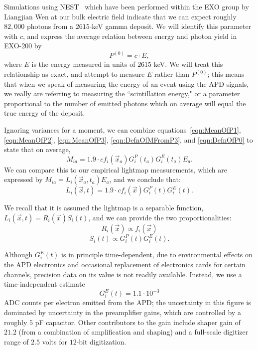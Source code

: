 Simulations using NEST~\cite{NESTpaper} which have been performed within the EXO group by Liangjian Wen at our bulk electric field indicate that we can expect roughly $82,000$ photons from a $2615$-keV gamma deposit.  We will identify this parameter with $c$, and express the average relation between energy and photon yield in EXO-200 by
\begin{equation} \label{eqn:DefnOfP0}
P^{(0)} = c \cdot E,
\end{equation}
where $E$ is the energy measured in units of $2615$ keV.  We will treat this relationship as exact, and attempt to measure $E$ rather than $P^{(0)}$; this means that when we speak of measuring the energy of an event using the APD signals, we really are referring to measuring the ``scintillation energy," or a parameter proportional to the number of emitted photons which on average will equal the true energy of the deposit.

Ignoring variances for a moment, we can combine equations~\ref{eqn:MeanOfP1}, \ref{eqn:MeanOfP2}, \ref{eqn:MeanOfP3}, \ref{eqn:DefnOfMFromP3}, and \ref{eqn:DefnOfP0} to state that on average,
\[M_{ia} = 1.9 \cdot c f_i(\vec{x}_a) G^P_i(t_a) G^E_i(t_a) E_a.\]
We can compare this to our empirical lightmap measurements, which are expressed by $M_{ia} = L_i(\vec{x}_a,t_a) E_a$,
and we conclude that:
\begin{equation}
L_i(\vec{x},t) = 1.9 \cdot c f_i(\vec{x}) G^P_i(t) G^E_i(t).
\end{equation}

We recall that it is assumed the lightmap is a separable function, $L_i(\vec{x},t) = R_i(\vec{x})S_i(t)$, and we can provide the two proportionalities:
\[ R_i(\vec{x}) \propto f_i(\vec{x}) \]
\[ S_i(t) \propto G^P_i(t) G^E_i(t).\]

Although $G^E_i(t)$ is in principle time-dependent, due to environmental effects on the APD electronics and occasional replacement of electronics cards for certain channels, precision data on its value is not readily available.  Instead, we use a time-independent estimate
\begin{equation}
G^E_i(t) = 1.1 \cdot 10^{-3} \label{eqn:ValueOfGE}
\end{equation}
ADC counts per electron emitted from the APD; the uncertainty in this figure is dominated by uncertainty in the preamplifier gains, which are controlled by a roughly $5$ pF capacitor.  Other contributors to the gain include shaper gain of $21.2$ (from a combination of amplification and shaping) and a full-scale digitizer range of $2.5$ volts for $12$-bit digitization.

